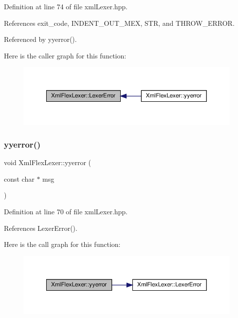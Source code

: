 Definition at line 74 of file xml\+Lexer.\+hpp.



References exit\+\_\+code, I\+N\+D\+E\+N\+T\+\_\+\+O\+U\+T\+\_\+\+M\+EX, S\+TR, and T\+H\+R\+O\+W\+\_\+\+E\+R\+R\+OR.



Referenced by yyerror().

Here is the caller graph for this function\+:
\nopagebreak
\begin{figure}[H]
\begin{center}
\leavevmode
\includegraphics[width=350pt]{d4/d3d/structXmlFlexLexer_a06098f140d995d7130576a4f60790999_icgraph}
\end{center}
\end{figure}
\mbox{\label{structXmlFlexLexer_a8580b2fc87fbe832fa75851217e82552}} 
\subsubsection{\texorpdfstring{yyerror()}{yyerror()}}
{\footnotesize\ttfamily void Xml\+Flex\+Lexer\+::yyerror (\begin{DoxyParamCaption}\item[{const char $\ast$}]{msg }\end{DoxyParamCaption})\hspace{0.3cm}{\ttfamily [inline]}}



Definition at line 70 of file xml\+Lexer.\+hpp.



References Lexer\+Error().

Here is the call graph for this function\+:
\nopagebreak
\begin{figure}[H]
\begin{center}
\leavevmode
\includegraphics[width=350pt]{d4/d3d/structXmlFlexLexer_a8580b2fc87fbe832fa75851217e82552_cgraph}
\end{center}
\end{figure}
\mbox{\label{structXmlFlexLexer_aa87fe47aa43520b34e7e638b8c16bc81}} 
